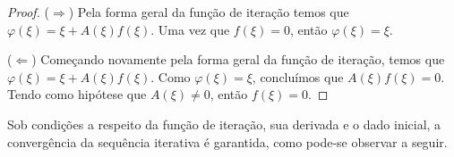 \begin{proof}
($\Rightarrow$) Pela forma geral da função de iteração temos que $\varphi(\xi) = \xi + A(\xi)f(\xi)$. Uma vez que $f(\xi) = 0$, então $\varphi(\xi) = \xi$.

($\Leftarrow$) Começando novamente pela forma geral da função de iteração, temos que $\varphi(\xi) = \xi + A(\xi)f(\xi)$. Como $\varphi(\xi) = \xi$, concluímos que $A(\xi) f(\xi) = 0$. Tendo como hipótese que $A(\xi) \neq 0$, então $f(\xi) = 0$.
\end{proof}



Sob condições a respeito da função de iteração, sua derivada e o dado inicial, a convergência da sequência iterativa é garantida, como pode-se observar a seguir.


